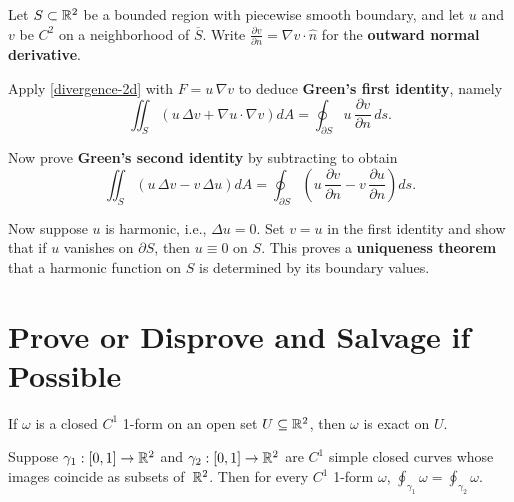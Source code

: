 \documentclass{homework}
\begin{document}
\begin{problem}\label{green-first-identity}%
  Let $S\subset\mathbb{R}^2$ be a bounded region with piecewise smooth boundary, and let $u$ and $v$ be $C^2$ on a neighborhood of $\overline{S}$.
  Write $\frac{\partial v}{\partial n} = \nabla v \cdot \hat n$ for the \textbf{outward normal derivative}.
  
  Apply \ref{divergence-2d} with $F = u\,\nabla v$ to deduce \textbf{Green's first identity}, namely
  \[
    \iint_S \left(u\,\Delta v + \nabla u\cdot\nabla v\right)dA = \oint_{\partial S} u\,\frac{\partial v}{\partial n}\,ds.
  \]
\end{problem}

\begin{problem}
  Now prove \textbf{Green's second identity} by subtracting to obtain
  \[
    \iint_S \left(u\,\Delta v - v\,\Delta u\right)dA = \oint_{\partial S}\left(u\,\frac{\partial v}{\partial n} - v\,\frac{\partial u}{\partial n}\right)ds.
  \]
\end{problem}

\begin{problem}
  Now suppose $u$ is harmonic, i.e., $\Delta u = 0$.  Set $v = u$ in the first identity and show that if $u$ vanishes on $\partial S$, then $u \equiv 0$ on $S$.
  This proves a \textbf{uniqueness theorem} that a harmonic function on $S$ is determined by its boundary values.
\end{problem}

\section{Prove or Disprove and Salvage if Possible}

\begin{problem}
  If $\omega$ is a closed $C^1$ 1-form on an open set $U\subseteq\mathbb{R}^2$, then $\omega$ is exact on $U$.
\end{problem}

\begin{problem}\label{same-curve-same-integral}%
  Suppose $\gamma_1:[0,1]\to\mathbb{R}^2$ and $\gamma_2:[0,1]\to\mathbb{R}^2$ are $C^1$ simple closed curves whose images coincide as subsets of~$\mathbb{R}^2$.
  Then for every $C^1$ 1-form $\omega$,
  \(
    \displaystyle\oint_{\gamma_1} \omega = \oint_{\gamma_2} \omega\).
  \end{problem}
\end{document}
